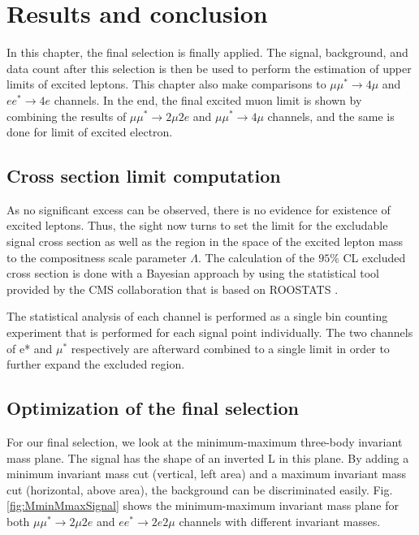 \chapter{Results and conclusion}
In this chapter, the final selection is finally applied. The signal, background, and data count after this selection is then be used to perform the estimation of upper limits of excited leptons. This chapter also make comparisons to $\mu\mu^{*}\rightarrow 4\mu$ and $ee^{*}\rightarrow 4e$ channels. In the end, the final excited muon limit is shown by combining the results of $\mu\mu^{*}\rightarrow 2\mu 2e$ and $\mu\mu^{*}\rightarrow 4\mu$ channels, and the same is done for limit of excited electron.    

\section{Cross section limit computation}

As no significant excess can be observed, there is no evidence for existence of excited leptons. Thus, the sight now turns to set the limit for the excludable signal cross section as well as the region in the space of the excited lepton mass to the compositness scale parameter $\Lambda$. The calculation of the $95 \%$ CL excluded cross section is done with a Bayesian approach by using the statistical tool provided by the CMS collaboration that is based on ROOSTATS \cite{RooStatsCl95, stat_HiggsPAG}.

The statistical analysis of each channel is performed as a single bin counting experiment that is performed for each signal point individually. The two channels of e* and $\mu^{*}$ respectively are afterward combined to a single limit in order to further expand the excluded region. 

\section{Optimization of the final selection}

\label{sec:optimization}For our final selection, we look at the minimum-maximum three-body invariant mass plane. The signal has the shape of an inverted L in this plane. By adding a minimum invariant mass cut (vertical, left area) and a maximum invariant mass cut (horizontal, above area), the background can be discriminated  easily. Fig. \ref{fig:MminMmaxSignal} shows the minimum-maximum invariant mass plane for both $\mu\mu^{*}\rightarrow 2\mu 2e$ and $ee^{*}\rightarrow 2e2\mu$ channels with different invariant masses. 

